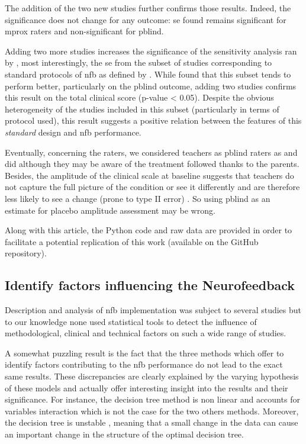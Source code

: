 The addition of the two new studies \citep{Strehl2017, Baumeister2016} further confirms those results. Indeed, 
the significance does not change for any outcome: \gls{se} found remains significant for \gls{mprox} raters and 
non-significant for \gls{pblind}. 

Adding two more studies increases the significance of the sensitivity analysis ran by \citeauthor{Cortese2016}, 
most interestingly, the \gls{se} from the subset of studies corresponding to standard protocols of \gls{nfb} as 
defined by \citet{Arns2014}. While \citeauthor{Cortese2016} found that this subset tends to perform better, particularly
on the \gls{pblind} outcome, adding two studies confirms this result on the total clinical score (p-value < 0.05). 
Despite the obvious heterogeneity of the studies included in this subset (particularly in terms of protocol used), 
this result suggests a positive relation between the features of this \emph{standard} design and \gls{nfb} performance.

Eventually, concerning the raters, we considered teachers as \gls{pblind} raters as \citeauthor{Cortese2016} and 
\citeauthor{Micoulaud2014} did although they may be aware of the treatment followed thanks to the parents. 
Besides, the amplitude of the clinical scale at baseline suggests that teachers do not capture the full picture of 
the condition or see it differently and are therefore less likely to see a change (prone to type II error) \citep{Sollie2013, Narad2015}.
So using \gls{pblind} as an estimate for placebo amplitude assessment may be wrong.

Along with this article, the Python code and raw data are provided in order to facilitate a potential replication of this work
(available on the GitHub repository).  


\subsection{Identify factors influencing the Neurofeedback}

Description and analysis of \gls{nfb} implementation was subject to several studies \citep{Arns2014, Enriquez2017, Vernon2004, Jeunet2018} 
but to our knowledge none used statistical tools to detect the influence of methodological, clinical and technical factors 
on such a wide range of studies. 

A somewhat puzzling result is the fact that the three methods which offer to identify factors contributing to the \gls{nfb} 
performance do not lead to the exact same results. These discrepancies are clearly explained by the varying hypothesis 
of these models and actually offer interesting insight into the results and their significance. For instance, the decision tree method is non 
linear and accounts for variables interaction which is not the case for the two others methods. Moreover, the decision tree is unstable 
\citep{dwyer2007}, meaning that a small change in the data can cause an important change in the structure of the optimal decision tree.

